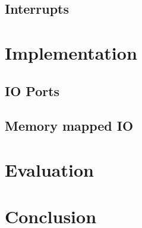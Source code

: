 \documentclass[
a4paper,
12pt,
notitlepage,
parskip=half,
DIV=11,
]{scrbook}
\begin{document}
		\section{Interrupts}
		
		
	\chapter{Implementation}
	
	\section{IO Ports}
	
	\section{Memory mapped IO}
	
	
	\chapter{Evaluation}
	\chapter{Conclusion}
	
	
	
	
\end{document}
